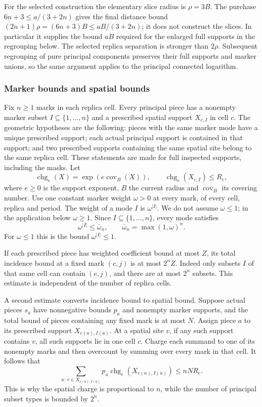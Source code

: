 For the selected construction the elementary slice radius is $\rho=3B$.
The purchase $6n+3\le a/(3+2n)$ gives the final distance bound
$(2n+1)\rho=(6n+3)B\le aB/(3+2n)$; it does not construct
the slices. In particular it supplies the bound $aB$ required for
the enlarged full supports in the regrouping below. The selected
replica separation is stronger than $2\rho$. Subsequent regrouping of pure principal
components preserves their full supports and marker unions, so the
same argument applies to the principal connected logarithm.

\subsubsection{Marker bounds and spatial bounds}

Fix $n\ge1$ marks in each replica cell. Every principal piece has a
nonempty marker subset $I\subseteq\{1,\ldots,n\}$ and a prescribed
spatial support $X_{c,I}$ in cell $c$. The geometric hypotheses are the
following: pieces with the same marker mode have a unique prescribed
support; each actual principal support is contained in that support;
and two prescribed supports containing the same spatial site belong
to the same replica cell. These statements are made for full inspected
supports, including the masks. Let
\[
 \operatorname{chg}_e(X)=\exp(e\operatorname{cov}_B(X)),\qquad
 \operatorname{chg}_e(X_{c,I})\le R_e,
\]
where $e\ge0$ is the support exponent, $B$ the current radius and
$\operatorname{cov}_B$ its covering number. Use one constant marker
weight $\omega>0$ at every mark, of every cell, replica and period.
The weight of a mode $I$ is $\omega^{|I|}$. We do not assume
$\omega\le1$; in the application below $\omega\ge1$. Since
$I\subseteq\{1,\ldots,n\}$, every mode satisfies
\begin{equation}\label{eq:allarity-mode-weight}
 \omega^{|I|}\le\bar\omega_n,\qquad
 \bar\omega_n=\max(1,\omega)^n .
\end{equation}
For $\omega\le1$ this is the bound $\omega^{|I|}\le1$.

If each prescribed piece has weighted coefficient bound at most $Z$,
its total incidence bound at a fixed mark $(c,j)$ is at most $2^nZ$.
Indeed only subsets $I$ of that same cell can contain $(c,j)$, and
there are at most $2^n$ subsets. This estimate is independent of the
number of replica cells.

A second estimate converts incidence bound to spatial bound. Suppose
actual pieces $s_a$ have nonnegative bounds $p_a$ and nonempty marker
supports, and the total bound of pieces containing any fixed mark is
at most $N$. Assign piece $a$ to its prescribed support
$X_{c(a),I(a)}$. At a spatial site $v$, if any such support contains
$v$, all such supports lie in one cell $c$. Charge each summand to
one of its nonempty marks and then overcount by summing over every
mark in that cell. It follows that
\begin{equation}\label{eq:allarity-spatial-incidence}
 \sum_{a:\,v\in X_{c(a),I(a)}}
            p_a\operatorname{chg}_e(X_{c(a),I(a)})
                    \le n N R_e.
\end{equation}
This is why the spatial charge is proportional to $n$, while the
number of principal subset types is bounded by $2^n$.

